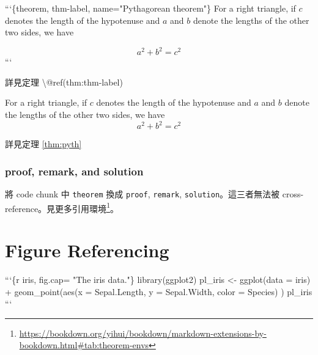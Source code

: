 \documentclass[oneside]{book}
\newenvironment{Shaded}{\begin{snugshade}}{\end{snugshade}}
\newcommand{\BaseNTok}[1]{\textcolor[rgb]{0.00,0.00,0.81}{#1}}
\newcommand{\NormalTok}[1]{#1}
\renewcommand{\href}[2]{#2\footnote{\url{#1}}}
\theoremstyle{definition}
\theoremstyle{definition}
\theoremstyle{definition}
\theoremstyle{remark}
\let\BeginKnitrBlock\begin \let\EndKnitrBlock\end
\begin{document}
\begin{Shaded}
\begin{Highlighting}[]
\NormalTok{```\{theorem, thm-label, name="Pythagorean theorem"\}}
\NormalTok{For a right triangle, if $c$ denotes the length of the hypotenuse}
\NormalTok{and $a$ and $b$ denote the lengths of the other two sides, we have}

\NormalTok{$$a^2 + b^2 = c^2$$}
\NormalTok{```}

\NormalTok{詳見定理 \textbackslash{}@ref(thm:thm-label)}
\end{Highlighting}
\end{Shaded}

\BeginKnitrBlock{theorem}[Pythagorean theorem]
\protect\hypertarget{thm:pyth}{}{\label{thm:pyth} {} }For a right triangle, if \(c\) denotes the length of the
hypotenuse and \(a\) and \(b\) denote the lengths of the other two
sides, we have \[a^2 + b^2 = c^2\]
\EndKnitrBlock{theorem}

詳見定理 \ref{thm:pyth}

\subsubsection*{proof, remark, and
solution}\label{proof-remark-and-solution}

將 code chunk 中 \texttt{theorem} 換成 \texttt{proof}, \texttt{remark},
\texttt{solution}。這三者無法被
cross-reference。見更多\href{https://bookdown.org/yihui/bookdown/markdown-extensions-by-bookdown.html\#tab:theorem-envs}{引用環境}。

\section{Figure Referencing}\label{figure-referencing}

\begin{Shaded}
\begin{Highlighting}[]
\NormalTok{```\{r iris, fig.cap= "The iris data."\}}
\NormalTok{library(ggplot2)}
\NormalTok{pl_iris <- ggplot(data = iris) +}
\BaseNTok{             geom_point(aes(x = Sepal.Length,}
\BaseNTok{                            y = Sepal.Width,}
\BaseNTok{                            color = Species)}
\BaseNTok{                        )}
\NormalTok{pl_iris}
\NormalTok{```}
\end{Highlighting}
\end{Shaded}
\end{document}

